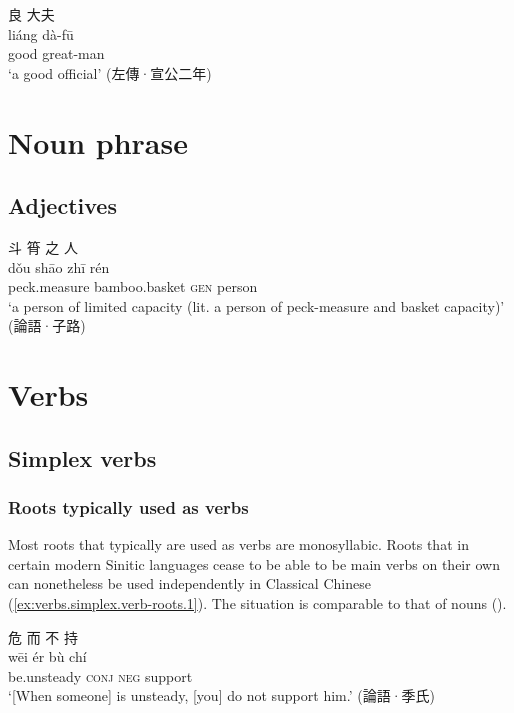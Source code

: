 \documentclass[UTF8, a4paper, oneside, scheme=plain, 12pt]{ctexrep}
\newcommand{\translate}[1]{`#1'}
\newcommand*{\category}[1]{\textsc{#1}}
\begin{document}
\begin{exe}
    \ex\label{ex:adjectives.1}
    \glll 良 大夫 \\
    liáng dà-fū \\
    good great-man \\
    \glt\translate{a good official} \hfill (左傳·宣公二年)
\end{exe}

\chapter{Noun phrase}

\section{Adjectives}

\begin{exe}
    \ex
    \glll 斗 筲 之 人 \\
    dǒu shāo zhī rén \\
    peck.measure bamboo.basket \category{gen} person \\
    \glt\translate{a person of limited capacity (lit. a person of peck-measure and basket capacity)} \hfill (論語·子路)
\end{exe}

\chapter{Verbs}

\section{Simplex verbs}

\subsection{Roots typically used as verbs}

Most roots that typically are used as verbs are monosyllabic.
Roots that in certain modern Sinitic languages cease to be able to be main verbs on their own 
can nonetheless be used independently in Classical Chinese (\ref{ex:verbs.simplex.verb-roots.1}).
The situation is comparable to that of nouns ().

\begin{exe}
    \ex\label{ex:verbs.simplex.verb-roots.1}
    \glll 危 而 不 持 \\
    wēi ér bù chí \\
    be.unsteady \category{conj} \category{neg} support \\
    \glt\translate{[When someone] is unsteady, [you] do not support him.} \hfill (論語·季氏)
\end{exe}
\end{document}
